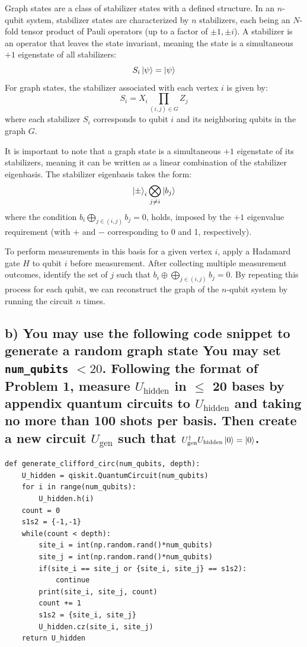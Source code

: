 \documentclass[a4paper, 11pt]{article}
\begin{document}
Graph states are a class of stabilizer states with a defined structure. 
In an $n$-qubit system, stabilizer states are characterized by $n$ stabilizers, each being an $N$-fold tensor product of Pauli operators (up to a factor of ${\pm 1, \pm i}$). 
A stabilizer is an operator that leaves the state invariant, meaning the state is a simultaneous $+1$ eigenstate of all stabilizers:
\begin{equation}
  S_{i} \ket{\psi} = \ket{\psi}
\end{equation}
For graph states, the stabilizer associated with each vertex $i$ is given by:
\begin{equation}
  S_{i} = X_{i} \prod_{(i,j)\in G} Z_j
\end{equation}
where each stabilizer $S_i$ corresponds to qubit $i$ and its neighboring qubits in the graph $G$.

It is important to note that a graph state is a simultaneous $+1$ eigenstate of its stabilizers, meaning it can be written as a linear combination of the stabilizer eigenbasis. The stabilizer eigenbasis takes the form:
\begin{equation}
  \ket{\pm}_{i} \bigotimes_{j \neq i} \ket{b_j}
\end{equation}
where the condition $b_i \bigoplus_{j \in (i,j)} b_{j} = 0$, holds, imposed by the $+1$ eigenvalue requirement (with $+$ and $-$ corresponding to 0 and 1, respectively).

To perform measurements in this basis for a given vertex $i$, apply a Hadamard gate $H$ to qubit $i$ before measurement. 
After collecting multiple measurement outcomes, identify the set of $j$ such that $b_i \oplus \bigoplus_{j \in (i,j)} b_j = 0$. 
By repeating this process for each qubit, we can reconstruct the graph of the $n$-qubit system by running the circuit $n$ times.

\subsection*{b) You may use the following code snippet to generate a random graph state
You may set \texttt{num\_qubits} $< 20$. 
Following the format of Problem 1, measure $U_{\text{hidden}}$ in $\leq$ 20 bases by appendix quantum circuits to $U_{\text{hidden}}$ and taking no more than 100 shots per basis. Then create a new circuit $U_{\text{gen}}$ such that
$U_{\text{gen}}^{\dagger}U_{\text{hidden}} \ket{0} = \ket{0}$. 
}
\begin{verbatim}
def generate_clifford_circ(num_qubits, depth):
    U_hidden = qiskit.QuantumCircuit(num_qubits)
    for i in range(num_qubits):
        U_hidden.h(i)
    count = 0
    s1s2 = {-1,-1}
    while(count < depth):
        site_i = int(np.random.rand()*num_qubits)
        site_j = int(np.random.rand()*num_qubits)
        if(site_i == site_j or {site_i, site_j} == s1s2):
            continue
        print(site_i, site_j, count)
        count += 1
        s1s2 = {site_i, site_j}
        U_hidden.cz(site_i, site_j)
    return U_hidden
\end{verbatim}
\end{document}
